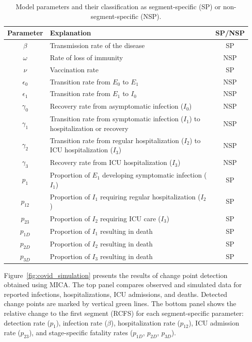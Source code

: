 \documentclass[10pt,letterpaper]{article}
\begin{document}
\begin{table}[h!]
\small
\centering
\begin{tabularx}{\textwidth}{|c|X|c|}
\hline
\textbf{Parameter} & \textbf{Explanation} & \textbf{SP/NSP} \\ \hline
\( \beta \) & Transmission rate of the disease & SP \\ \hline
\( \omega \) & Rate of loss of immunity & NSP \\ \hline
\( \nu \) & Vaccination rate & SP \\ \hline
\( \epsilon_0 \) & Transition rate from \( E_0 \) to \( E_1 \) & NSP \\ \hline
\( \epsilon_1 \) & Transition rate from \( E_1 \) to \( I_0 \) & NSP \\ \hline
\( \gamma_0 \) & Recovery rate from asymptomatic infection (\( I_0 \)) & NSP \\ \hline
\( \gamma_1 \) & Transition rate from symptomatic infection (\( I_1 \)) to hospitalization or recovery & NSP \\ \hline
\( \gamma_2 \) & Transition rate from regular hospitalization (\( I_2 \)) to ICU hospitalization (\( I_3 \)) & NSP \\ \hline
\( \gamma_3 \) & Recovery rate from ICU hospitalization (\( I_3 \)) & NSP \\ \hline
\( p_1 \) & Proportion of \( E_1 \) developing symptomatic infection (\( I_1 \)) & SP \\ \hline
\( p_{12} \) & Proportion of \( I_1 \) requiring regular hospitalization (\( I_2 \)) & SP \\ \hline
\( p_{23} \) & Proportion of \( I_2 \) requiring ICU care (\( I_3 \)) & SP \\ \hline
\( p_{1D} \) & Proportion of \( I_1 \) resulting in death & SP \\ \hline
\( p_{2D} \) & Proportion of \( I_2 \) resulting in death & SP \\ \hline
\( p_{3D} \) & Proportion of \( I_3 \) resulting in death & SP \\ \hline
\end{tabularx}
\caption{Model parameters and their classification as segment-specific (SP) or non-segment-specific (NSP).}
\label{tab:parameters}
\end{table}


Figure~\ref{fig:covid_simulation} presents the results of change point
detection obtained using MICA. The top panel compares observed and simulated data for reported infections, hospitalizations, ICU admissions, and deaths. Detected change points are marked by vertical green lines. The bottom panel shows the relative change to the first segment (RCFS) for each segment-specific parameter: detection rate ($p_1$), infection rate ($\beta$), hospitalization rate ($p_{12}$), ICU admission rate ($p_{23}$), and stage-specific fatality rates ($p_{1D}$, $p_{2D}$, $p_{3D}$).
\end{document}
